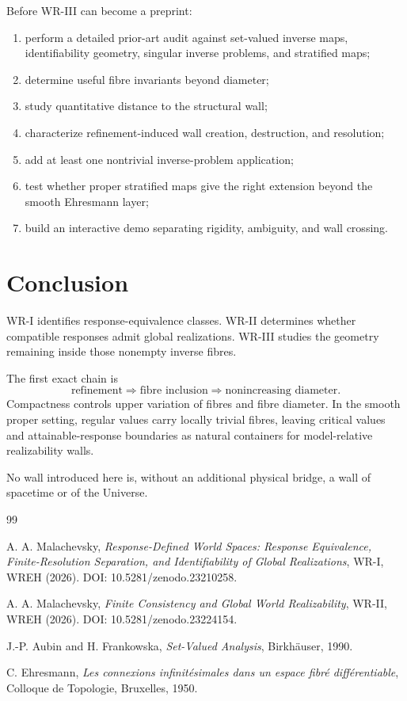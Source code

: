 \documentclass[11pt]{article}
\begin{document}
Before WR-III can become a preprint:

\begin{enumerate}
\item perform a detailed prior-art audit against set-valued inverse maps,
identifiability geometry, singular inverse problems, and stratified maps;
\item determine useful fibre invariants beyond diameter;
\item study quantitative distance to the structural wall;
\item characterize refinement-induced wall creation, destruction, and
resolution;
\item add at least one nontrivial inverse-problem application;
\item test whether proper stratified maps give the right extension beyond the
smooth Ehresmann layer;
\item build an interactive demo separating rigidity, ambiguity, and wall
crossing.
\end{enumerate}

\section*{Conclusion}

WR-I identifies response-equivalence classes. WR-II determines whether
compatible responses admit global realizations. WR-III studies the geometry
remaining inside those nonempty inverse fibres.

The first exact chain is
\[
\text{refinement}
\Longrightarrow
\text{fibre inclusion}
\Longrightarrow
\text{nonincreasing diameter}.
\]
Compactness controls upper variation of fibres and fibre diameter. In the
smooth proper setting, regular values carry locally trivial fibres, leaving
critical values and attainable-response boundaries as natural containers for
model-relative realizability walls.

No wall introduced here is, without an additional physical bridge, a wall of
spacetime or of the Universe.

\begin{thebibliography}{99}

A. A. Malachevsky,
\emph{Response-Defined World Spaces: Response Equivalence,
Finite-Resolution Separation, and Identifiability of Global Realizations},
WR-I, WREH (2026).
DOI: 10.5281/zenodo.23210258.

A. A. Malachevsky,
\emph{Finite Consistency and Global World Realizability},
WR-II, WREH (2026).
DOI: 10.5281/zenodo.23224154.

J.-P. Aubin and H. Frankowska,
\emph{Set-Valued Analysis},
Birkh\"auser, 1990.

C. Ehresmann,
\emph{Les connexions infinit\'esimales dans un espace fibr\'e
diff\'erentiable},
Colloque de Topologie, Bruxelles, 1950.

\end{thebibliography}
\end{document}
